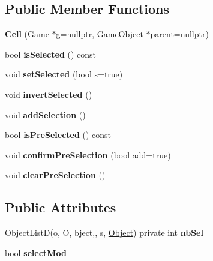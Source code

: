\subsection*{\-Public \-Member \-Functions}
\begin{DoxyCompactItemize}
\item 
\hypertarget{class_cell_ad2edfbf561021e72a464888921c0b576}{{\bfseries \-Cell} (\hyperlink{class_game}{\-Game} $\ast$g=nullptr, \hyperlink{class_game_object}{\-Game\-Object} $\ast$parent=nullptr)}\label{class_cell_ad2edfbf561021e72a464888921c0b576}

\item 
\hypertarget{class_cell_a394830e18401f3b414c3dde4a2b4e2e8}{bool {\bfseries is\-Selected} () const }\label{class_cell_a394830e18401f3b414c3dde4a2b4e2e8}

\item 
\hypertarget{class_cell_a40146bbb2b74cf56337462abc4d0327c}{void {\bfseries set\-Selected} (bool s=true)}\label{class_cell_a40146bbb2b74cf56337462abc4d0327c}

\item 
\hypertarget{class_cell_ad8310bd5ddbdcb3ab3036356556b32b3}{void {\bfseries invert\-Selected} ()}\label{class_cell_ad8310bd5ddbdcb3ab3036356556b32b3}

\item 
\hypertarget{class_cell_a9801c2d435d44834bd14a80fba778618}{void {\bfseries add\-Selection} ()}\label{class_cell_a9801c2d435d44834bd14a80fba778618}

\item 
\hypertarget{class_cell_aa7456089022c5d2dabd4325d03007759}{bool {\bfseries is\-Pre\-Selected} () const }\label{class_cell_aa7456089022c5d2dabd4325d03007759}

\item 
\hypertarget{class_cell_a16f6d41be75c42ad20ad29d0b5725ece}{void {\bfseries confirm\-Pre\-Selection} (bool add=true)}\label{class_cell_a16f6d41be75c42ad20ad29d0b5725ece}

\item 
\hypertarget{class_cell_aa0704872b8d4ae7f40022cfebfa48944}{void {\bfseries clear\-Pre\-Selection} ()}\label{class_cell_aa0704872b8d4ae7f40022cfebfa48944}

\end{DoxyCompactItemize}
\subsection*{\-Public \-Attributes}
\begin{DoxyCompactItemize}
\item 
\hypertarget{class_cell_a70f60ede53fb663eb11dd543211bf4cf}{\-Object\-List\-D(o, \-O, bject,, s, \*
\hyperlink{class_object}{\-Object}) private int {\bfseries nb\-Sel}}\label{class_cell_a70f60ede53fb663eb11dd543211bf4cf}

\item 
\hypertarget{class_cell_a5891847674379c2fd25a4d08962a21ba}{bool {\bfseries select\-Mod}}\label{class_cell_a5891847674379c2fd25a4d08962a21ba}

\end{DoxyCompactItemize}



